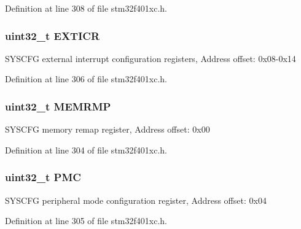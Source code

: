 Definition at line 308 of file stm32f401xc.\+h.

\subsubsection[{\texorpdfstring{E\+X\+T\+I\+CR}{EXTICR}}]{ uint32\+\_\+t E\+X\+T\+I\+CR}\hypertarget{struct_s_y_s_c_f_g___type_def_af18ed332be387d38ef90cccdfd3f78fc}{}\label{struct_s_y_s_c_f_g___type_def_af18ed332be387d38ef90cccdfd3f78fc}
S\+Y\+S\+C\+FG external interrupt configuration registers, Address offset\+: 0x08-\/0x14 

Definition at line 306 of file stm32f401xc.\+h.

\subsubsection[{\texorpdfstring{M\+E\+M\+R\+MP}{MEMRMP}}]{ uint32\+\_\+t M\+E\+M\+R\+MP}\hypertarget{struct_s_y_s_c_f_g___type_def_ab36c409d0a009e3ce5a89ac55d3ff194}{}\label{struct_s_y_s_c_f_g___type_def_ab36c409d0a009e3ce5a89ac55d3ff194}
S\+Y\+S\+C\+FG memory remap register, Address offset\+: 0x00 

Definition at line 304 of file stm32f401xc.\+h.

\subsubsection[{\texorpdfstring{P\+MC}{PMC}}]{ uint32\+\_\+t P\+MC}\hypertarget{struct_s_y_s_c_f_g___type_def_a2130abf1fefb63ce4c4b138fd8c9822a}{}\label{struct_s_y_s_c_f_g___type_def_a2130abf1fefb63ce4c4b138fd8c9822a}
S\+Y\+S\+C\+FG peripheral mode configuration register, Address offset\+: 0x04 

Definition at line 305 of file stm32f401xc.\+h.

